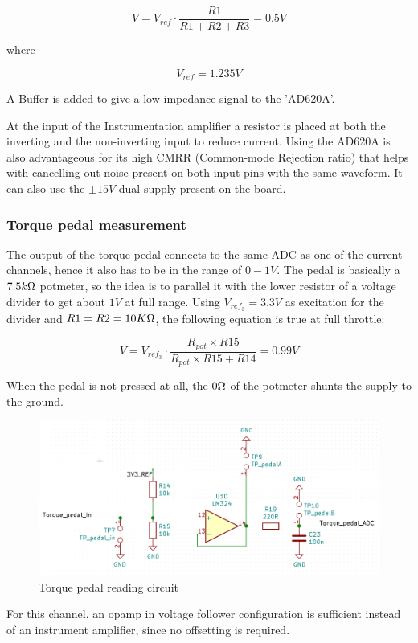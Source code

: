 	\begin{equation}
		V = V_{ref} \cdot \frac{R1}{R1+R2+R3} = 0.5V
	\end{equation}
	
	where 
	
	\begin{equation}
	V_{ref} = 1.235V
	\end{equation}
	
	A Buffer is added to give a low impedance signal to the 'AD620A'.
	
	At the input of the Instrumentation amplifier a resistor is placed at both the inverting and the non-inverting input to reduce current. Using the AD620A is also advantageous for its high CMRR (Common-mode Rejection ratio) that helps with cancelling out noise present on both input pins with the same waveform. It can also use the $\pm15V$ dual supply present on the board.
	
	\subsubsection{Torque pedal measurement}
	The output of the torque pedal connects to the same ADC as one of the current channels, hence it also has to be in the range of $0-1V$. The pedal is basically a $7.5k\ohm$ potmeter, so the idea is to parallel it with the lower resistor of a voltage divider to get about $1V$ at full range. Using $V_{ref_3} = 3.3V$ as excitation for the divider and $R1 = R2 = 10K\ohm$, the following equation is true at full throttle: 
	
	\begin{equation}
		V = V_{ref_3} \cdot \frac{R_{pot} \times R15}{R_{pot} \times R15 + R14} = 0.99V
	\end{equation}
	
	When the pedal is not pressed at all, the $0\ohm$ of the potmeter shunts the supply to the ground.
	
	\begin{figure}[H]
	\centering
	\includegraphics[width=0.6\linewidth]{pictures/hardware/Analog_Interface_board/torque_pedal_divider.png}
	\caption{Torque pedal reading circuit}
	\label{fig:torque_pedal_divider}
\end{figure}
	
	For this channel, an opamp in voltage follower configuration is sufficient instead of an instrument amplifier, since no offsetting is required.
